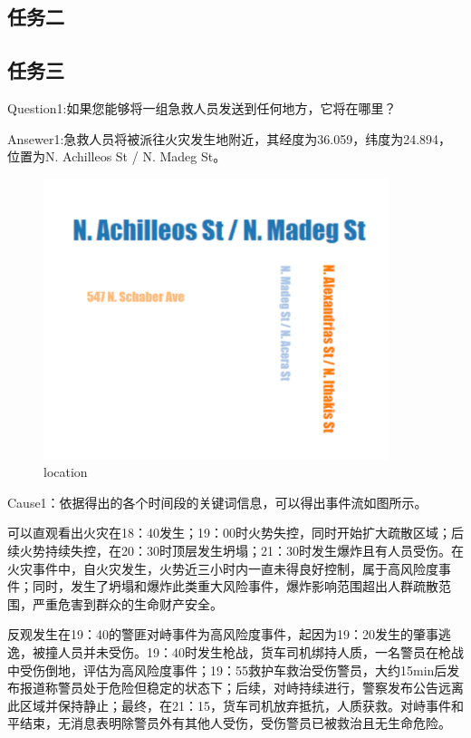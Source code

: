 \documentclass[a4paper]{article}
\begin{document}
\subsection{任务二}
\subsection{任务三}
Question1:如果您能够将一组急救人员发送到任何地方，它将在哪里？

Ansewer1:急救人员将被派往火灾发生地附近，其经度为36.059，纬度为24.894，位置为N. Achilleos St / N. Madeg St。

\begin{figure}[H]
  \centering
  \includegraphics[width=0.9\textwidth]{images/3-2.png}
  \caption{location}\label{fig:3-2}
  \vspace{\baselineskip}
\end{figure}

Cause1：依据得出的各个时间段的关键词信息，可以得出事件流如图所示。

可以直观看出火灾在18：40发生；19：00时火势失控，同时开始扩大疏散区域；后续火势持续失控，在20：30时顶层发生坍塌；21：30时发生爆炸且有人员受伤。在火灾事件中，自火灾发生，火势近三小时内一直未得良好控制，属于高风险度事件；同时，发生了坍塌和爆炸此类重大风险事件，爆炸影响范围超出人群疏散范围，严重危害到群众的生命财产安全。

反观发生在19：40的警匪对峙事件为高风险度事件，起因为19：20发生的肇事逃逸，被撞人员并未受伤。19：40时发生枪战，货车司机绑持人质，一名警员在枪战中受伤倒地，评估为高风险度事件；19：55救护车救治受伤警员，大约15min后发布报道称警员处于危险但稳定的状态下；后续，对峙持续进行，警察发布公告远离此区域并保持静止；最终，在21：15，货车司机放弃抵抗，人质获救。对峙事件和平结束，无消息表明除警员外有其他人受伤，受伤警员已被救治且无生命危险。
\end{document}
